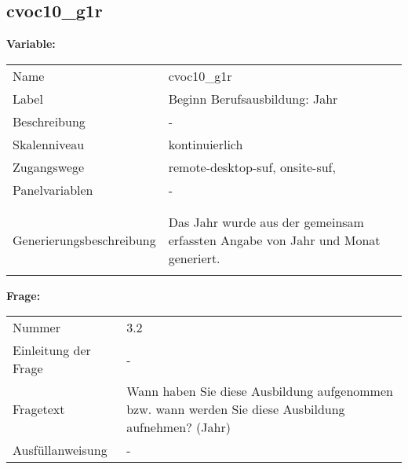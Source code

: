 	
	
	\subsection{cvoc10\_g1r}
	\label{subSection:cvoc10_g1r}

	\noindent\textbf{Variable:}\\
		\begin{tabular}{lL{11.3cm}}
			\label{tableVariable:cvoc10_g1r}
			Name & cvoc10\_g1r \\
			Label & Beginn Berufsausbildung: Jahr \\
			Beschreibung & - \\
			Skalenniveau & kontinuierlich \\
			Zugangswege &
				remote-desktop-suf,
				onsite-suf,
 \\
			Panelvariablen & -
			 \\
			 \\
 \\
					Generierungsbeschreibung & Das Jahr wurde aus der gemeinsam erfassten Angabe von Jahr und Monat generiert. 
				 \\	
			 \\
		\end{tabular}

		\vspace*{1 cm}
		\noindent\textbf{Frage:}\\
		\begin{tabular}{lL{11.3cm}}
			\label{tableQuestion:cvoc10_g1r}
			Nummer & 3.2 \\
			Einleitung der Frage & - \\
			Fragetext & Wann haben Sie diese Ausbildung aufgenommen bzw. wann werden Sie diese Ausbildung aufnehmen?
(Jahr) \\
			Ausfüllanweisung & - \\
		\end{tabular}




